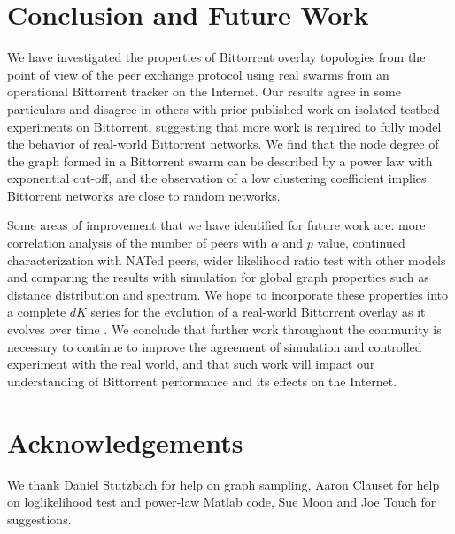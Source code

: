 \documentclass[paper]{ieice}
\begin{document}
\section{Conclusion and Future Work}\label{conclude}
We have investigated the properties of Bittorrent overlay topologies from the point of view of the peer exchange protocol using real swarms from an operational Bittorrent tracker on the Internet. 
Our results agree in some particulars and disagree in others with prior published work on isolated testbed experiments on Bittorrent, suggesting that more work is required to fully model the behavior of real-world Bittorrent networks.
We find that the node degree of the graph formed in a Bittorrent swarm can be described by a power law with exponential cut-off, and the observation of a low clustering coefficient implies Bittorrent networks are close to random networks.

Some areas of improvement that we have identified for future work are: more correlation analysis of the number of peers with $\alpha$ and $p$ value, continued characterization with NATed peers, wider likelihood ratio test with other models and comparing the results with simulation for global graph properties such as distance distribution and spectrum.
We hope to incorporate these properties into a complete $dK$ series for the evolution of a real-world Bittorrent overlay as it evolves over time \cite{mahadevan2006systematic}. 
We conclude that further work throughout the community is necessary to continue to improve the agreement of simulation and controlled experiment with the real world, and that such work will impact our understanding of Bittorrent performance and its effects on the Internet.


\section*{Acknowledgements}
We thank Daniel Stutzbach for help on graph sampling, Aaron Clauset for help on loglikelihood test and power-law Matlab code, Sue Moon and Joe Touch for suggestions.


\end{document}

